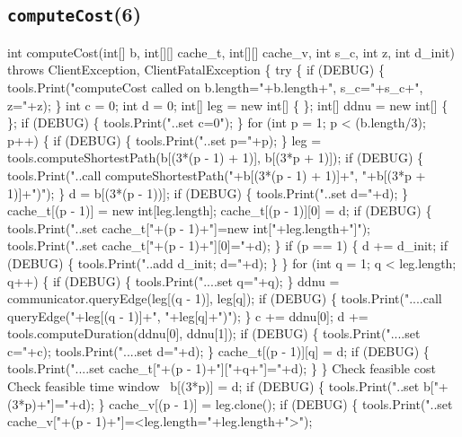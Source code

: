 \documentclass{article}
\begin{document}
\subsection{\texttt{computeCost}(6)}
\nwenddocs{}\endmoddef{}
int computeCost(int[] b, int[][] cache_t, int[][] cache_v, int s_c, int z, int d_init)
throws ClientException, ClientFatalException \{
  try \{
    if (DEBUG) \{
      tools.Print("computeCost called on b.length="+b.length+", s_c="+s_c+", z="+z);
    \}
    int c = 0;
    int d = 0;
    int[] leg = new int[] \{ \};
    int[] ddnu = new int[] \{ \};
    if (DEBUG) \{
      tools.Print("..set c=0");
    \}
    for (int p = 1; p < (b.length/3); p++) \{
      if (DEBUG) \{
        tools.Print("..set p="+p);
      \}
      leg = tools.computeShortestPath(b[(3*(p - 1) + 1)], b[(3*p + 1)]);
      if (DEBUG) \{
        tools.Print("..call computeShortestPath("+b[(3*(p - 1) + 1)]+", "+b[(3*p + 1)]+")");
      \}
      d = b[(3*(p - 1))];
      if (DEBUG) \{
        tools.Print("..set d="+d);
      \}
      cache_t[(p - 1)] = new int[leg.length];
      cache_t[(p - 1)][0] = d;
      if (DEBUG) \{
        tools.Print("..set cache_t["+(p - 1)+"]=new int["+leg.length+"]");
        tools.Print("..set cache_t["+(p - 1)+"][0]="+d);
      \}
      if (p == 1) \{
        d += d_init;
        if (DEBUG) \{
          tools.Print("..add d_init; d="+d);
        \}
      \}
      for (int q = 1; q < leg.length; q++) \{
        if (DEBUG) \{
          tools.Print("....set q="+q);
        \}
        ddnu = communicator.queryEdge(leg[(q - 1)], leg[q]);
        if (DEBUG) \{
          tools.Print("....call queryEdge("+leg[(q - 1)]+", "+leg[q]+")");
        \}
        c += ddnu[0];
        d += tools.computeDuration(ddnu[0], ddnu[1]);
        if (DEBUG) \{
          tools.Print("....set c="+c);
          tools.Print("....set d="+d);
        \}
        cache_t[(p - 1)][q] = d;
        if (DEBUG) \{
          tools.Print("....set cache_t["+(p - 1)+"]["+q+"]="+d);
        \}
      \}
      \LA{}Check feasible cost~{\nwtagstyle{}}\RA{}
      \LA{}Check feasible time window~{\nwtagstyle{}}\RA{}
      b[(3*p)] = d;
      if (DEBUG) \{
        tools.Print("..set b["+(3*p)+"]="+d);
      \}
      cache_v[(p - 1)] = leg.clone();
      if (DEBUG) \{
        tools.Print("..set cache_v["+(p - 1)+"]=<leg.length="+leg.length+">");
\end{document}
